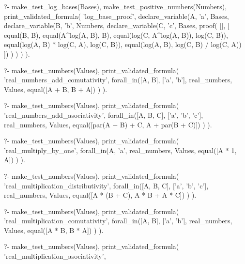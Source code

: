 \begin{prolog}
?-	make_test_log_bases(Bases),
	make_test_positive_numbers(Numbers),
	print_validated_formula(
		'log_base_proof',
		declare_variable(A, 'a', Bases,
			declare_variable(B, 'b', Numbers,
				declare_variable(C, 'c', Bases,
					proof(
					[],
					[
						equal(B, B),
						equal(A^log(A, B), B),
						equal(log(C, A^log(A, B)), log(C, B)),
						equal(log(A, B) * log(C, A), log(C, B)),
						equal(log(A, B), log(C, B) / log(C, A))
					])
				)
			)
		)
	).				
\end{prolog}


\begin{fact}
\begin{prolog}
?-	make_test_numbers(Values),
	print_validated_formula(
		'real_numbers_add_comutativity',
		forall_in([A, B], ['a', 'b'], real_numbers, Values,
			equal([A + B, B + A])
		)
	).
\end{prolog}
\begin{prolog}
?-	make_test_numbers(Values),
	print_validated_formula(
		'real_numbers_add_asociativity',
		forall_in([A, B, C], ['a', 'b', 'c'], real_numbers, Values,
			equal([par(A + B) + C, A + par(B + C)])
		)
	).
\end{prolog}
\begin{prolog}
?-	make_test_numbers(Values),
	print_validated_formula(
		'real_multiply_by_one',
		forall_in(A, 'a', real_numbers, Values,
			equal([A * 1, A])
		)
	).				
\end{prolog}
\begin{prolog}
?-	make_test_numbers(Values),
	print_validated_formula(
		'real_multiplication_distributivity',
		forall_in([A, B, C], ['a', 'b', 'c'], real_numbers, Values,
			equal([A * (B + C), A * B + A * C])
		)
	).				
\end{prolog}
\begin{prolog}
?-	make_test_numbers(Values),
	print_validated_formula(
		'real_multiplication_comutativity',
		forall_in([A, B], ['a', 'b'], real_numbers, Values,
			equal([A * B, B * A])
		)
	).				
\end{prolog}
\begin{prolog}
?-	make_test_numbers(Values),
	print_validated_formula(
		'real_multiplication_asociativity',

\end{prolog}
\end{fact}
